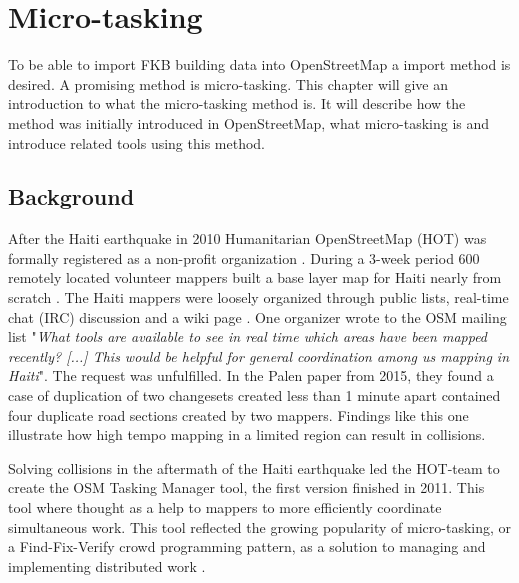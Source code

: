 
\chapter{Micro-tasking}\label{ch:microtask}
To be able to import FKB building data into OpenStreetMap a import method is desired. A promising method is micro-tasking. This chapter will give an introduction to what the micro-tasking method is. It will describe how the method was initially introduced in OpenStreetMap, what micro-tasking is and introduce related tools using this method. 

\section{Background}
After the Haiti earthquake in 2010 Humanitarian OpenStreetMap (HOT) was formally registered as a non-profit organization \cite{Soden}. During a 3-week period 600 remotely located volunteer mappers built a base layer map for Haiti nearly from scratch \cite{Soden}. The Haiti mappers were loosely organized through public lists, real-time chat (IRC) discussion and a wiki page \cite{Palen2015}. One organizer wrote to the OSM mailing list "\textit{What tools are available to see in real time which areas have been mapped recently? [...] This would be helpful for general coordination among us mapping in Haiti}". The request was unfulfilled. In the Palen paper from 2015, they found a case of duplication of two changesets created less than 1 minute apart contained four duplicate road sections created by two mappers. Findings like this one illustrate how high tempo mapping in a limited region can result in collisions. 

Solving collisions in the aftermath of the Haiti earthquake led the HOT-team to create the OSM Tasking Manager tool, the first version finished in 2011. This tool where thought as a help to mappers to more efficiently coordinate simultaneous work. This tool reflected the growing popularity of micro-tasking, or a Find-Fix-Verify crowd programming pattern, as a solution to managing and implementing distributed work \cite{Bernstein2015}.  

